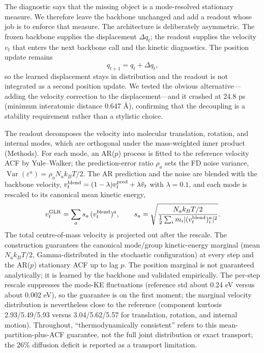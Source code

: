 The diagnostic says that the missing object is a mode-resolved stationary measure. We therefore
leave the backbone unchanged and add a readout whose job is to enforce that measure. The
architecture is deliberately asymmetric. The frozen backbone supplies the displacement
\(\Delta q_t\); the readout supplies the velocity \(v_t\) that enters the next backbone call and
the kinetic diagnostics. The position update remains
\begin{equation}
q_{t+1}=q_t+\Delta q_t,
\end{equation}
so the learned displacement stays in distribution and the readout is not integrated as a second
position update. We tested the obvious alternative---adding the velocity correction to the
displacement---and it crashed at 24.8 ps (minimum interatomic distance 0.647 \AA), confirming that
the decoupling is a stability requirement rather than a stylistic choice.

The readout decomposes the velocity into molecular translation, rotation, and internal modes,
which are orthogonal under the mass-weighted inner product (Methods). For each mode, an AR(\(p\))
process is fitted to the reference velocity ACF by Yule--Walker; the prediction-error ratio
\(\rho_a\) sets the FD noise variance, \(\operatorname{Var}(\varepsilon^a)=\rho_a N_a k_BT/2\).
The AR prediction and the noise are blended with the backbone velocity,
\(v_t^{\rm blend}=(1-\lambda)v_t^{\rm pred}+\lambda\tilde v_t\) with \(\lambda=0.1\), and each mode
is rescaled to its canonical mean kinetic energy,
\begin{equation}
v_t^{\rm GLR}=\sum_a s_a\,(v_t^{\rm blend})^a,\qquad
s_a=\sqrt{\frac{N_a k_BT/2}{\tfrac12\sum_i m_i|(v_t^{\rm blend})_i^a|^2}}.
\end{equation}
The total centre-of-mass velocity is projected out after the rescale. The construction guarantees
the canonical mode/group kinetic-energy marginal (mean \(N_a k_BT/2\), Gamma-distributed in the stochastic configuration) at every step and the AR(\(p\)) stationary ACF up to lag
\(p\). The position marginal is not guaranteed analytically; it is learned by the backbone and
validated empirically. The per-step rescale suppresses the mode-KE fluctuations (reference std
about 0.24 eV versus about 0.002 eV), so the guarantee is on the first moment; the marginal
velocity distribution is nevertheless close to the reference (component kurtosis
2.93/5.49/5.93 versus 3.04/5.62/5.57 for translation, rotation, and internal motion). Throughout,
``thermodynamically consistent'' refers to this mean-partition-plus-ACF guarantee, not the full
joint distribution or exact transport; the 26\% diffusion deficit is reported as a transport
limitation.

